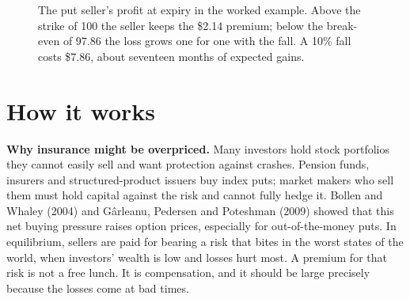 \begin{figure}[htbp]
\centering
{}
\caption{The put seller's profit at expiry in the worked example. Above the strike of 100 the seller keeps the \$2.14 premium; below the break-even of 97.86 the loss grows one for one with the fall. A 10\% fall costs \$7.86, about seventeen months of expected gains.}
\label{fig:14-put}
\end{figure}

\section{How it works}
\label{sec:14-how}

\textbf{Why insurance might be overpriced.} Many investors hold stock portfolios they cannot easily sell and want protection against crashes. Pension funds, insurers and structured-product issuers buy index puts; market makers who sell them must hold capital against the risk and cannot fully hedge it. Bollen and Whaley (2004) and G\^arleanu, Pedersen and Poteshman (2009) showed that this net buying pressure raises option prices, especially for out-of-the-money puts. In equilibrium, sellers are paid for bearing a risk that bites in the worst states of the world, when investors' wealth is low and losses hurt most. A premium for that risk is not a free lunch. It is compensation, and it should be large precisely because the losses come at bad times.


